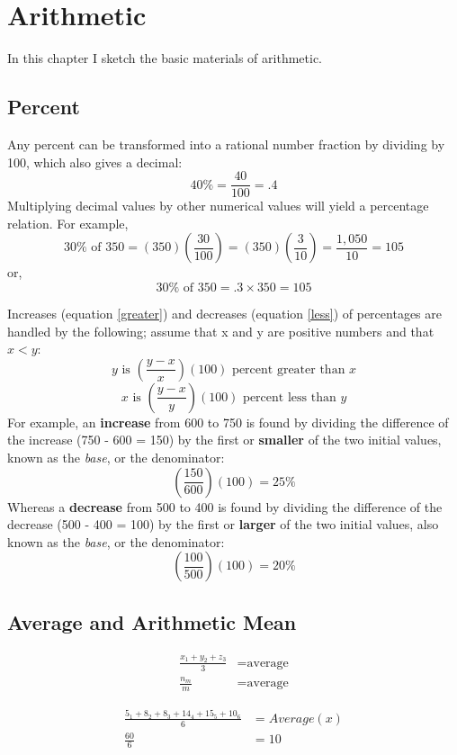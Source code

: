 

\chapter{Arithmetic}
In this chapter I sketch the basic materials of arithmetic. 
      \section{Percent}
Any percent can be transformed into a rational number fraction by dividing by 100, which also gives a decimal:
\[ 40\% = \frac{40}{100} = .4 \]
Multiplying decimal values by other numerical values will yield a percentage relation. For example,
\[ 30\% \text{ of } 350 = (350)\left(\frac{30}{100}\right) = (350)\left(\frac{3}{10}\right) = \frac{1,050}{10} = 105 \] 
or,
\[ 30\% \text{ of } 350 = .3\times350 = 105 \]

Increases (equation \ref{greater}) and decreases (equation \ref{less}) of percentages are handled by the following; assume that x and y are positive numbers and that $x < y$:
\begin{equation}\label{greater}
    y \text{ is }\left(\frac{y-x}{x} \right)(100) \text{ percent greater than } x
\end{equation}
\begin{equation}\label{less}
     x \text{ is }\left(\frac{y-x}{y} \right)(100) \text{ percent less than } y
\end{equation}
For example, an \textbf{increase} from 600 to 750 is found by dividing the difference of the increase (750 - 600 = 150) by the first or \textbf{smaller} of the two initial values, known as the \textsl{base}, or the denominator:
\[ \left(\frac{150}{600}\right)(100) = 25\%\]
Whereas a \textbf{decrease} from 500 to 400 is found by dividing the difference of the decrease (500 - 400 = 100) by the first or \textbf{larger} of the two initial values, also known as the \textsl{base}, or the denominator:
\[ \left(\frac{100}{500}\right)(100) = 20\%\]

      \section{Average and Arithmetic Mean}
\begin{align}
    \frac{x_1 + y_2 + z_3}{3} &= \text{average}\\
\frac{n_m}{m} &= \text{average}
\end{align}
\begin{example}
      \begin{equation}
   \begin{split}
\frac{5_1 + 8_2 + 8_3 + 14_4 + 15_5 + 10_6}{6} &= Average(x)\\
 \frac{60}{6} &= 10
   \end{split} 
      \end{equation}
\end{example}


